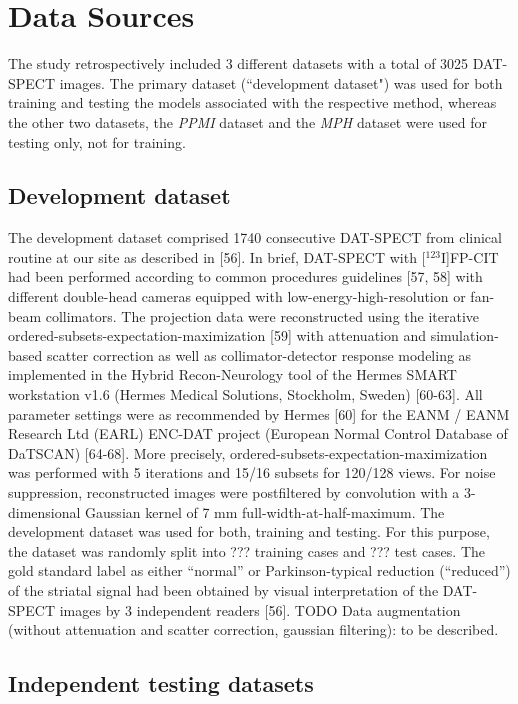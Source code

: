 \section{Data Sources}
\label{sec:data}

The study retrospectively included 3 different datasets with a total of 3025 DAT-SPECT images.
The primary dataset (``development dataset") was used for both training and testing the models associated with the respective method, 
whereas the other two datasets, the \textit{PPMI} dataset and the \textit{MPH} dataset were used for testing only, not for training.

\subsection{Development dataset}
\label{subsec:spect_dataset}

The development dataset comprised 1740 consecutive DAT-SPECT from clinical routine at our site as described in [56]. 
In brief, DAT-SPECT with [$^{123}$I]FP-CIT had been performed according to common procedures guidelines [57, 58] with different double-head cameras 
equipped with low-energy-high-resolution or fan-beam collimators. 
The projection data were reconstructed using the iterative ordered-subsets-expectation-maximization [59] with attenuation and simulation-based scatter correction 
as well as collimator-detector response modeling as implemented in the Hybrid Recon-Neurology tool of the Hermes SMART workstation v1.6 (Hermes Medical Solutions, Stockholm, Sweden) [60-63]. 
All parameter settings were as recommended by Hermes [60] for the EANM / EANM Research Ltd (EARL) ENC-DAT project (European Normal Control Database of DaTSCAN) [64-68]. 
More precisely, ordered-subsets-expectation-maximization was performed with 5 iterations and 15/16 subsets for 120/128 views. 
For noise suppression, reconstructed images were postfiltered by convolution with a 3-dimensional Gaussian kernel of 7 mm full-width-at-half-maximum. 
The development dataset was used for both, training and testing. For this purpose, the dataset was randomly split into ??? training cases and ??? test cases. 
The gold standard label as either “normal” or Parkinson-typical reduction (“reduced”) of the striatal signal had been obtained by visual interpretation of the DAT-SPECT images by 3 independent readers [56]. 
TODO Data augmentation (without attenuation and scatter correction, gaussian filtering): to be described.

\subsection{Independent testing datasets}
\label{subsec:external_dataset}

